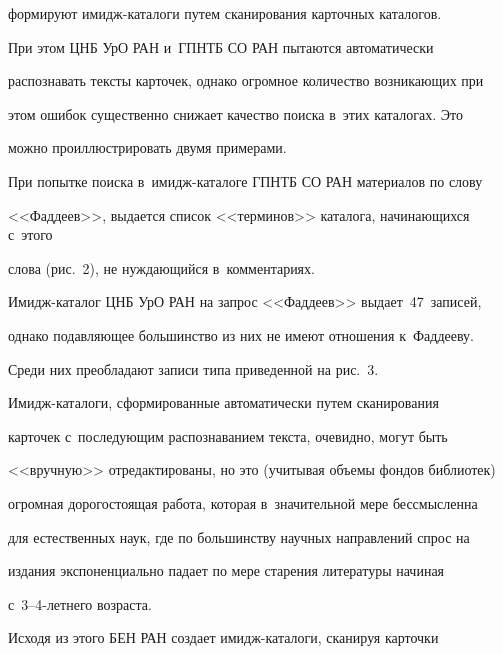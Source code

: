формируют имидж-ка\-та\-ло\-ги путем сканирования карточных каталогов. 


При этом ЦНБ УрО РАН и~ГПНТБ СО РАН пытаются автоматически 


распознавать тексты карточек, однако огромное количество возникающих при 


этом ошибок существенно снижает качество поиска в~этих каталогах. Это 


можно про\-ил\-люст\-ри\-ро\-вать двумя примерами.


  


  При попытке поиска в~имидж-каталоге ГПНТБ СО РАН материалов по слову 


<<Фаддеев>>, выдается список <<терминов>> каталога, начинающихся с~этого 


слова (рис.~2), не нуждающийся в~комментариях. 


  








  


  Имидж-каталог ЦНБ УрО РАН на запрос <<Фаддеев>> выдает~47~записей, 


однако подавляющее большинство из них не имеют отношения к~Фаддееву. 


Среди них преобладают записи типа приведенной на рис.~3. 


  


  


  Имидж-каталоги, сформированные автоматически путем сканирования 


карточек с~последующим распознаванием текста, очевидно, могут быть 


<<вручную>> отредактированы, но это (учитывая объемы фондов библиотек) 


огромная дорогостоящая работа, которая в~значительной мере бессмысленна 


для естественных наук, где по большинству научных направлений спрос на 


издания экспоненциально падает по мере старения литературы начиная 


  с~3--4-лет\-не\-го возраста.


  


  Исходя из этого БЕН РАН создает имидж-ка\-та\-ло\-ги, сканируя карточки 



